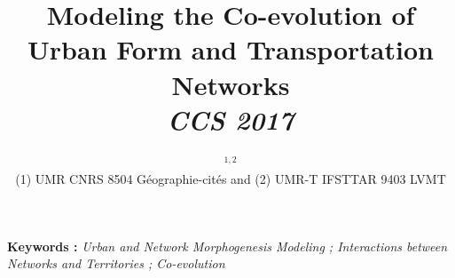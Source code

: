 


\title{\vspace{-1.5cm}Modeling the Co-evolution of Urban Form and Transportation Networks\\
\textit{CCS 2017}
}
\author{\small{}$^{1,2}$\\
\small(1) UMR CNRS 8504 Géographie-cités and (2) UMR-T IFSTTAR 9403 LVMT
}

\date{}

\maketitle

\justify


\vspace{-0.5cm}
\textbf{Keywords : }\textit{Urban and Network Morphogenesis Modeling ; Interactions between Networks and Territories ; Co-evolution}

\bigskip


